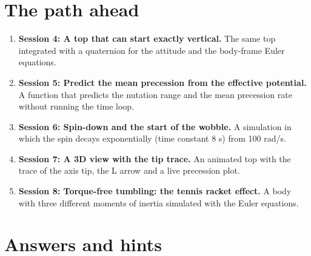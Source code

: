 \documentclass[11pt,a4paper]{article}
\begin{document}
\section{The path ahead}
\begin{enumerate}[nosep]
\item \textbf{Session 4: A top that can start exactly vertical.} The same top integrated with a quaternion for the attitude and the body-frame Euler equations.
\item \textbf{Session 5: Predict the mean precession from the effective potential.} A function that predicts the nutation range and the mean precession rate without running the time loop.
\item \textbf{Session 6: Spin-down and the start of the wobble.} A simulation in which the spin decays exponentially (time constant 8 s) from 100 rad/s.
\item \textbf{Session 7: A 3D view with the tip trace.} An animated top with the trace of the axis tip, the L arrow and a live precession plot.
\item \textbf{Session 8: Torque-free tumbling: the tennis racket effect.} A body with three different moments of inertia simulated with the Euler equations.
\end{enumerate}

\section{Answers and hints}
\end{document}
